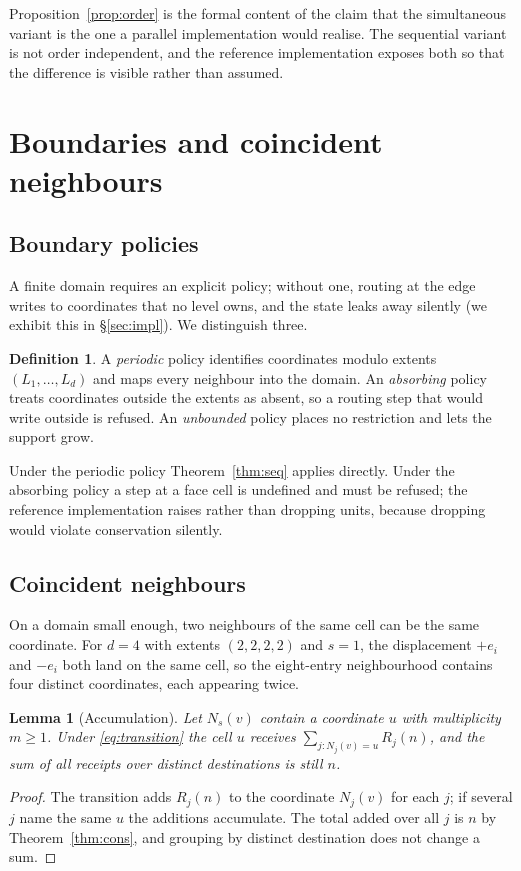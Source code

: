 \documentclass[11pt,a4paper]{article}
\newtheorem{lemma}{Lemma}
\theoremstyle{definition}
\newtheorem{definition}{Definition}
\begin{document}
Proposition~\ref{prop:order} is the formal content of the claim that the
simultaneous variant is the one a parallel implementation would realise. The
sequential variant is not order independent, and the reference implementation
exposes both so that the difference is visible rather than assumed.

\section{Boundaries and coincident neighbours}\label{sec:boundary}

\subsection{Boundary policies}

A finite domain requires an explicit policy; without one, routing at the edge
writes to coordinates that no level owns, and the state leaks away silently
(we exhibit this in \S\ref{sec:impl}). We distinguish three.

\begin{definition}
A \emph{periodic} policy identifies coordinates modulo extents
$(L_1,\ldots,L_d)$ and maps every neighbour into the domain. An
\emph{absorbing} policy treats coordinates outside the extents as absent, so a
routing step that would write outside is refused. An \emph{unbounded} policy
places no restriction and lets the support grow.
\end{definition}

Under the periodic policy Theorem~\ref{thm:seq} applies directly. Under the
absorbing policy a step at a face cell is undefined and must be refused; the
reference implementation raises rather than dropping units, because dropping
would violate conservation silently.

\subsection{Coincident neighbours}

On a domain small enough, two neighbours of the same cell can be the same
coordinate. For $d = 4$ with extents $(2,2,2,2)$ and $s = 1$, the displacement
$+e_i$ and $-e_i$ both land on the same cell, so the eight-entry neighbourhood
contains four distinct coordinates, each appearing twice.

\begin{lemma}[Accumulation]\label{lem:coincide}
Let $N_s(v)$ contain a coordinate $u$ with multiplicity $m \geq 1$. Under
\eqref{eq:transition} the cell $u$ receives $\sum_{j : N_j(v) = u} R_j(n)$,
and the sum of all receipts over distinct destinations is still $n$.
\end{lemma}
\begin{proof}
The transition adds $R_j(n)$ to the coordinate $N_j(v)$ for each $j$; if
several $j$ name the same $u$ the additions accumulate. The total added over
all $j$ is $n$ by Theorem~\ref{thm:cons}, and grouping by distinct destination
does not change a sum.
\end{proof}
\end{document}
